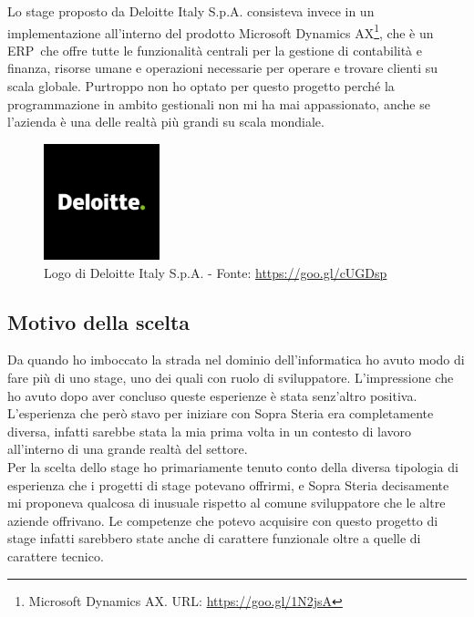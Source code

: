 Lo stage proposto da Deloitte Italy S.p.A. consisteva invece in un implementazione all'interno del prodotto Microsoft Dynamics AX\footnote{Microsoft Dynamics AX. URL: \url{https://goo.gl/1N2jsA}}, che è un ERP\glossario\ che offre tutte le funzionalità centrali per la gestione di contabilità e finanza, risorse umane e operazioni necessarie per operare e trovare clienti su scala globale. Purtroppo non ho optato per questo progetto perché la programmazione in ambito gestionali non mi ha mai appassionato, anche se l'azienda è una delle realtà più grandi su scala mondiale.\\
	\begin{figure}[H]
		\centering
	   	\includegraphics[width=0.3\textwidth]{immagini/deloitte}
	   	\caption{Logo di Deloitte Italy S.p.A. - Fonte: \url{https://goo.gl/cUGDsp}}
	\end{figure}

\subsection{Motivo della scelta}

Da quando ho imboccato la strada nel dominio dell'informatica ho avuto modo di fare più di uno stage, uno dei quali con ruolo di sviluppatore. L'impressione che ho avuto dopo aver concluso queste esperienze è stata senz'altro positiva. L'esperienza che però stavo per iniziare con Sopra Steria era completamente diversa, infatti sarebbe stata la mia prima volta in un contesto di lavoro all'interno di una grande realtà del settore.\\

Per la scelta dello stage ho primariamente tenuto conto della diversa tipologia di esperienza che i progetti di stage potevano offrirmi, e Sopra Steria decisamente mi proponeva qualcosa di inusuale rispetto al comune sviluppatore che le altre aziende offrivano. Le competenze che potevo acquisire con questo progetto di stage infatti sarebbero state anche di carattere funzionale oltre a quelle di carattere tecnico.\\

